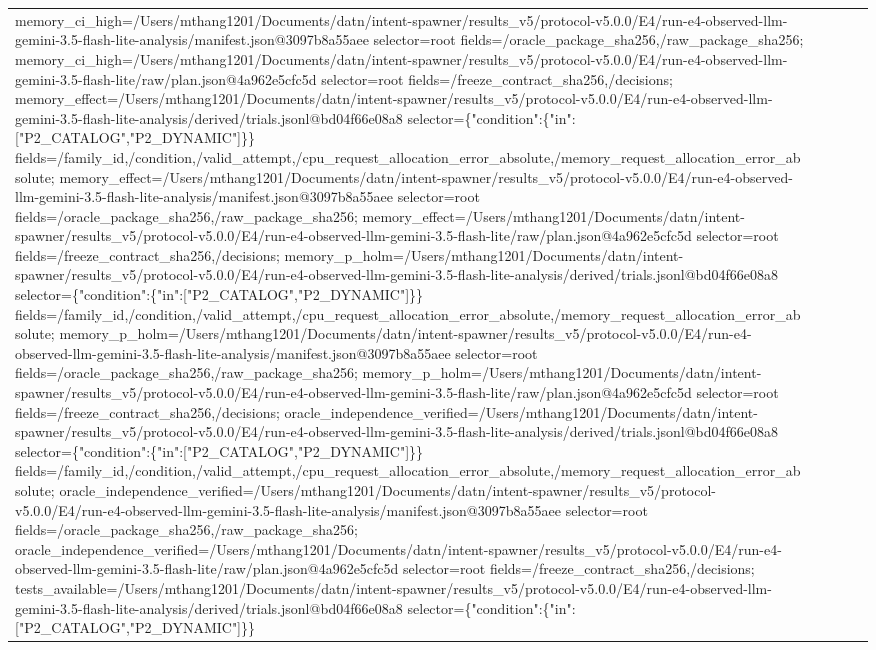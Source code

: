 \begin{tabular}{lllll}
memory\_ci\_high=/Users/mthang1201/Documents/datn/intent-spawner/results\_v5/protocol-v5.0.0/E4/run-e4-observed-llm-gemini-3.5-flash-lite-analysis/manifest.json@3097b8a55aee selector=root fields=/oracle\_package\_sha256,/raw\_package\_sha256; memory\_ci\_high=/Users/mthang1201/Documents/datn/intent-spawner/results\_v5/protocol-v5.0.0/E4/run-e4-observed-llm-gemini-3.5-flash-lite/raw/plan.json@4a962e5cfc5d selector=root fields=/freeze\_contract\_sha256,/decisions; memory\_effect=/Users/mthang1201/Documents/datn/intent-spawner/results\_v5/protocol-v5.0.0/E4/run-e4-observed-llm-gemini-3.5-flash-lite-analysis/derived/trials.jsonl@bd04f66e08a8 selector=\{"condition":\{"in":["P2\_CATALOG","P2\_DYNAMIC"]\}\} fields=/family\_id,/condition,/valid\_attempt,/cpu\_request\_allocation\_error\_absolute,/memory\_request\_allocation\_error\_absolute; memory\_effect=/Users/mthang1201/Documents/datn/intent-spawner/results\_v5/protocol-v5.0.0/E4/run-e4-observed-llm-gemini-3.5-flash-lite-analysis/manifest.json@3097b8a55aee selector=root fields=/oracle\_package\_sha256,/raw\_package\_sha256; memory\_effect=/Users/mthang1201/Documents/datn/intent-spawner/results\_v5/protocol-v5.0.0/E4/run-e4-observed-llm-gemini-3.5-flash-lite/raw/plan.json@4a962e5cfc5d selector=root fields=/freeze\_contract\_sha256,/decisions; memory\_p\_holm=/Users/mthang1201/Documents/datn/intent-spawner/results\_v5/protocol-v5.0.0/E4/run-e4-observed-llm-gemini-3.5-flash-lite-analysis/derived/trials.jsonl@bd04f66e08a8 selector=\{"condition":\{"in":["P2\_CATALOG","P2\_DYNAMIC"]\}\} fields=/family\_id,/condition,/valid\_attempt,/cpu\_request\_allocation\_error\_absolute,/memory\_request\_allocation\_error\_absolute; memory\_p\_holm=/Users/mthang1201/Documents/datn/intent-spawner/results\_v5/protocol-v5.0.0/E4/run-e4-observed-llm-gemini-3.5-flash-lite-analysis/manifest.json@3097b8a55aee selector=root fields=/oracle\_package\_sha256,/raw\_package\_sha256; memory\_p\_holm=/Users/mthang1201/Documents/datn/intent-spawner/results\_v5/protocol-v5.0.0/E4/run-e4-observed-llm-gemini-3.5-flash-lite/raw/plan.json@4a962e5cfc5d selector=root fields=/freeze\_contract\_sha256,/decisions; oracle\_independence\_verified=/Users/mthang1201/Documents/datn/intent-spawner/results\_v5/protocol-v5.0.0/E4/run-e4-observed-llm-gemini-3.5-flash-lite-analysis/derived/trials.jsonl@bd04f66e08a8 selector=\{"condition":\{"in":["P2\_CATALOG","P2\_DYNAMIC"]\}\} fields=/family\_id,/condition,/valid\_attempt,/cpu\_request\_allocation\_error\_absolute,/memory\_request\_allocation\_error\_absolute; oracle\_independence\_verified=/Users/mthang1201/Documents/datn/intent-spawner/results\_v5/protocol-v5.0.0/E4/run-e4-observed-llm-gemini-3.5-flash-lite-analysis/manifest.json@3097b8a55aee selector=root fields=/oracle\_package\_sha256,/raw\_package\_sha256; oracle\_independence\_verified=/Users/mthang1201/Documents/datn/intent-spawner/results\_v5/protocol-v5.0.0/E4/run-e4-observed-llm-gemini-3.5-flash-lite/raw/plan.json@4a962e5cfc5d selector=root fields=/freeze\_contract\_sha256,/decisions; tests\_available=/Users/mthang1201/Documents/datn/intent-spawner/results\_v5/protocol-v5.0.0/E4/run-e4-observed-llm-gemini-3.5-flash-lite-analysis/derived/trials.jsonl@bd04f66e08a8 selector=\{"condition":\{"in":["P2\_CATALOG","P2\_DYNAMIC"]\}\} 
\end{tabular}
